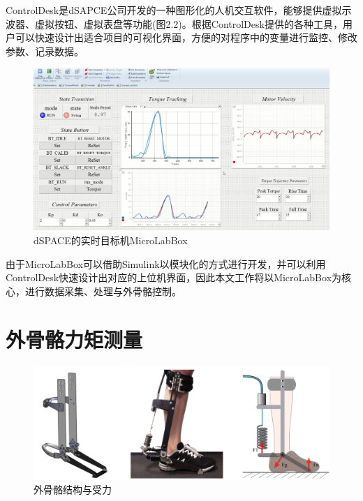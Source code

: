 ControlDesk是dSAPCE公司开发的一种图形化的人机交互软件，能够提供虚拟示波器、虚拟按钮、虚拟表盘等功能(图2.2)。根据ControlDesk提供的各种工具，用户可以快速设计出适合项目的可视化界面，方便的对程序中的变量进行监控、修改参数、记录数据。
\begin{figure}[htb]
    \includegraphics[width=14cm]{fig/f22.jpg}
    \caption{dSPACE的实时目标机MicroLabBox}
    \label{fig:mark}
\end{figure}

由于MicroLabBox可以借助Simulink以模块化的方式进行开发，并可以利用ControlDesk快速设计出对应的上位机界面，因此本文工作将以MicroLabBox为核心，进行数据采集、处理与外骨骼控制。

\section{外骨骼力矩测量}
\begin{figure}[htb]
    \includegraphics[width=14cm]{fig/f23.jpg}
    \caption{外骨骼结构与受力}
    \label{fig:mark}
\end{figure}

